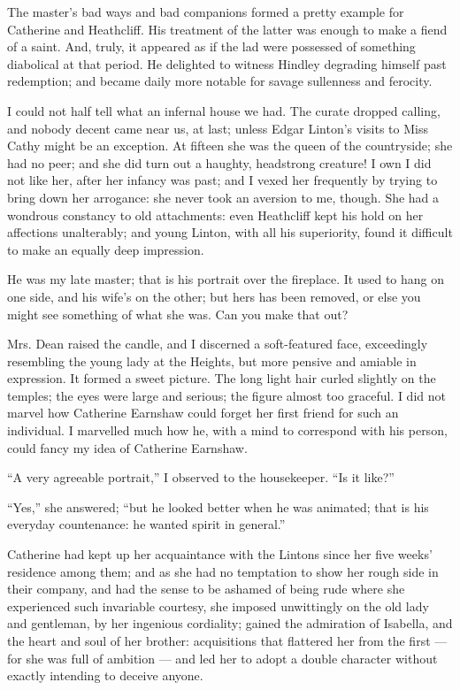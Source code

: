 \par The master's bad ways and bad companions formed a pretty example for Catherine and Heathcliff. His treatment of the latter was enough to make a fiend of a saint. And, truly, it appeared as if the lad were possessed of something diabolical at that period. He delighted to witness Hindley degrading himself past redemption; and became daily more notable for savage sullenness and ferocity.
\par I could not half tell what an infernal house we had. The curate dropped calling, and nobody decent came near us, at last; unless Edgar Linton's visits to Miss Cathy might be an exception. At fifteen she was the queen of the countryside; she had no peer; and she did turn out a haughty, headstrong creature! I own I did not like her, after her infancy was past; and I vexed her frequently by trying to bring down her arrogance: she never took an aversion to me, though. She had a wondrous constancy to old attachments: even Heathcliff kept his hold on her affections unalterably; and young Linton, with all his superiority, found it difficult to make an equally deep impression.
\par He was my late master; that is his portrait over the fireplace. It used to hang on one side, and his wife's on the other; but hers has been removed, or else you might see something of what she was. Can you make that out?
\par 
\par Mrs. Dean raised the candle, and I discerned a soft-featured face, exceedingly resembling the young lady at the Heights, but more pensive and amiable in expression. It formed a sweet picture. The long light hair curled slightly on the temples; the eyes were large and serious; the figure almost too graceful. I did not marvel how Catherine Earnshaw could forget her first friend for such an individual. I marvelled much how he, with a mind to correspond with his person, could fancy my idea of Catherine Earnshaw.
\par “A very agreeable portrait,” I observed to the housekeeper. “Is it like?”
\par “Yes,” she answered; “but he looked better when he was animated; that is his everyday countenance: he wanted spirit in general.”
\par 
\par Catherine had kept up her acquaintance with the Lintons since her five weeks' residence among them; and as she had no temptation to show her rough side in their company, and had the sense to be ashamed of being rude where she experienced such invariable courtesy, she imposed unwittingly on the old lady and gentleman, by her ingenious cordiality; gained the admiration of Isabella, and the heart and soul of her brother: acquisitions that flattered her from the first — for she was full of ambition — and led her to adopt a double character without exactly intending to deceive anyone.

